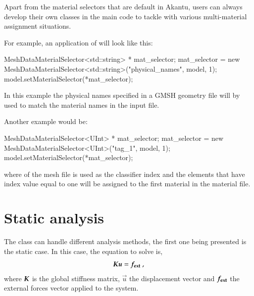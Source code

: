 Apart from the material selectors that are default in Akantu, users can always
develop their own classes in the main code to tackle with various multi-material
assignment situations.

For example, an application of  will look like this:

\begin{cpp}
MeshDataMaterialSelector<std::string> * mat_selector;
mat_selector = new MeshDataMaterialSelector<std::string>("physical_names", model, 1);
model.setMaterialSelector(*mat_selector);
\end{cpp}

In this example the physical names specified in a GMSH geometry file will by
used to match the material names in the input file.

Another example would be:

\begin{cpp}
MeshDataMaterialSelector<UInt> * mat_selector;
mat_selector = new MeshDataMaterialSelector<UInt>("tag_1", model, 1);
model.setMaterialSelector(*mat_selector);
\end{cpp}

where  of the mesh file is used as the classifier index and the
elements that have index value equal to one will be assigned to the first
material in the material file.


\section{Static analysis\label{sect:smm:static}}

The  class can handle different analysis
methods, the first one being presented is the static case.  In this
case, the equation to solve is,
\begin{equation}
  \label{eqn:smm:static} \boldsymbol{K} \boldsymbol{u} =
  \boldsymbol{f_{{\mathrm{ext}}}}~,
\end{equation} 
where $\boldsymbol{K}$ is the global stiffness matrix,
$\vec{u}$ the displacement vector and $\boldsymbol{f_{{\mathrm{ext}}}}$ the
external forces vector applied to the system.

